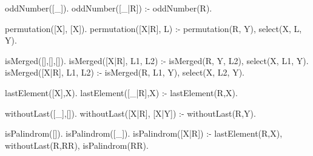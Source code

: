 oddNumber([_]).
oddNumber([_|R]) :- \+ oddNumber(R).

permutation([X], [X]).
permutation([X|R], L) :- permutation(R, Y), select(X, L, Y).


isMerged([],[],[]).
isMerged([X|R], L1, L2) :- isMerged(R, Y, L2), select(X, L1, Y).
isMerged([X|R], L1, L2) :- isMerged(R, L1, Y), select(X, L2, Y).

lastElement([X],X).
lastElement([_|R],X) :- lastElement(R,X).

withoutLast([_],[]).
withoutLast([X|R], [X|Y]) :- withoutLast(R,Y).

isPalindrom([]).
isPalindrom([_]).
isPalindrom([X|R]) :- lastElement(R,X), withoutLast(R,RR), isPalindrom(RR).
